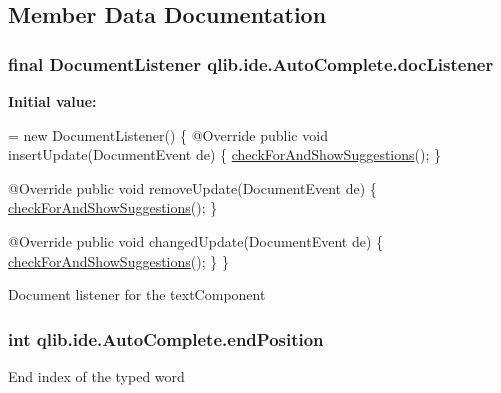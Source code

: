 \subsection{Member Data Documentation}
\subsubsection[{\texorpdfstring{doc\+Listener}{docListener}}]{\setlength{\rightskip}{0pt plus 5cm}final Document\+Listener qlib.\+ide.\+Auto\+Complete.\+doc\+Listener\hspace{0.3cm}{\ttfamily [private]}}\hypertarget{classqlib_1_1ide_1_1AutoComplete_a79190bf245b656b279233a982ed4248c}{}\label{classqlib_1_1ide_1_1AutoComplete_a79190bf245b656b279233a982ed4248c}
{\bfseries Initial value\+:}
\begin{DoxyCode}
= \textcolor{keyword}{new} DocumentListener() \{
        @Override
        \textcolor{keyword}{public} \textcolor{keywordtype}{void} insertUpdate(DocumentEvent de) \{
            \hyperlink{classqlib_1_1ide_1_1AutoComplete_a04a7f33c4d243d3d15592c3b0b1b19d4}{checkForAndShowSuggestions}();
        \}

        @Override
        \textcolor{keyword}{public} \textcolor{keywordtype}{void} removeUpdate(DocumentEvent de) \{
            \hyperlink{classqlib_1_1ide_1_1AutoComplete_a04a7f33c4d243d3d15592c3b0b1b19d4}{checkForAndShowSuggestions}();
        \}

        @Override
        \textcolor{keyword}{public} \textcolor{keywordtype}{void} changedUpdate(DocumentEvent de) \{
            \hyperlink{classqlib_1_1ide_1_1AutoComplete_a04a7f33c4d243d3d15592c3b0b1b19d4}{checkForAndShowSuggestions}();
        \}
    \}
\end{DoxyCode}
Document listener for the text\+Component 
\subsubsection[{\texorpdfstring{end\+Position}{endPosition}}]{\setlength{\rightskip}{0pt plus 5cm}int qlib.\+ide.\+Auto\+Complete.\+end\+Position\hspace{0.3cm}{\ttfamily [private]}}\hypertarget{classqlib_1_1ide_1_1AutoComplete_ab737bdeda6e26125bc85ad00f5de14d2}{}\label{classqlib_1_1ide_1_1AutoComplete_ab737bdeda6e26125bc85ad00f5de14d2}
End index of the typed word 
